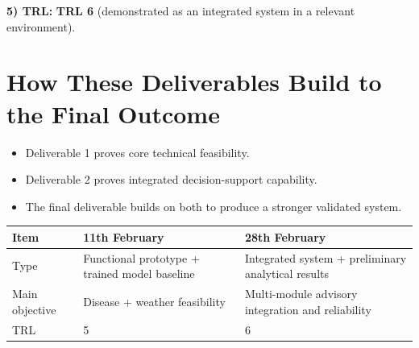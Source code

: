 \documentclass[10pt,a4paper]{article}
\begin{document}
\textbf{5) TRL:} \textbf{TRL 6} (demonstrated as an integrated system in a relevant environment).

\section*{How These Deliverables Build to the Final Outcome}
\begin{itemize}[noitemsep]
  \item Deliverable 1 proves core technical feasibility.
  \item Deliverable 2 proves integrated decision-support capability.
  \item The final deliverable builds on both to produce a stronger validated system.
\end{itemize}

\begin{table}[h]
\centering
\small
\begin{tabular}{@{}lll@{}}
\toprule
\textbf{Item} & \textbf{11th February} & \textbf{28th February} \\
\midrule
Type & Functional prototype + trained model baseline & Integrated system + preliminary analytical results \\
Main objective & Disease + weather feasibility & Multi-module advisory integration and reliability \\
TRL & 5 & 6 \\
\bottomrule
\end{tabular}
\end{table}
\end{document}
